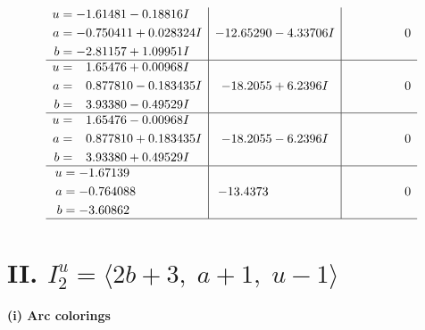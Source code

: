 \documentclass[1p]{elsarticle_modified}
\theoremstyle{definition}
\begin{document}
$$\begin{array}{c|c|c}
\begin{aligned}
u &= -1.61481 - 0.18816 I \\
a &= -0.750411 + 0.028324 I \\
b &= -2.81157 + 1.09951 I\end{aligned}
 & -12.65290 - 4.33706 I & \phantom{-0.000000 } 0 \\ \hline\begin{aligned}
u &= \phantom{-}1.65476 + 0.00968 I \\
a &= \phantom{-}0.877810 - 0.183435 I \\
b &= \phantom{-}3.93380 - 0.49529 I\end{aligned}
 & -18.2055 + 6.2396 I & \phantom{-0.000000 } 0 \\ \hline\begin{aligned}
u &= \phantom{-}1.65476 - 0.00968 I \\
a &= \phantom{-}0.877810 + 0.183435 I \\
b &= \phantom{-}3.93380 + 0.49529 I\end{aligned}
 & -18.2055 - 6.2396 I & \phantom{-0.000000 } 0 \\ \hline\begin{aligned}
u &= -1.67139\phantom{ +0.000000I} \\
a &= -0.764088\phantom{ +0.000000I} \\
b &= -3.60862\phantom{ +0.000000I}\end{aligned}
 & -13.4373\phantom{ +0.000000I} & \phantom{-0.000000 } 0\\
 \hline 
 \end{array}$$\newpage\newpage\renewcommand{\arraystretch}{1}
\centering \section*{II. $I^u_{2}= \langle 2 b+3,\;a+1,\;u-1 \rangle$}
\flushleft \textbf{(i) Arc colorings}\\
\end{document}
